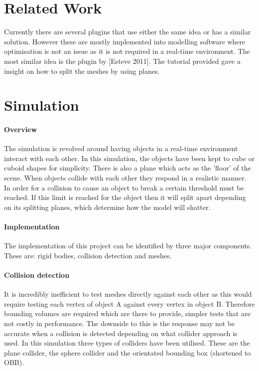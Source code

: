 \documentclass[conference,backref=page]{acmsiggraph}
\begin{document}
\section{Related Work}

Currently there are several plugins that use either the same idea or
has a similar solution. However these are mostly implemented into
modelling software where optimisation is not an issue as it is not
required in a real-time environment. The most similar idea is the
plugin by [Esteve 2011]. The tutorial provided gave a insight on how to split the meshes by using planes.

\section{Simulation}

\paragraph{Overview} \hfill

The simulation is revolved around having objects in a real-time environment interact with each other. In this simulation, the objects have been kept to cube or cuboid shapes for simplicity. There is also a plane which acts as the 'floor' of the scene. When objects collide with each other they respond in a realistic manner. In order for a collision to cause an object to break a certain threshold must be reached. If this limit is reached for the object then it will split apart depending on its splitting planes, which determine how the model will shatter.

\paragraph{Implementation}

The implementation of this project can be identified by three major components.  These are: rigid bodies, collision detection and meshes. 

\paragraph {Collision detection} \hfill

It is incredibly inefficient to test meshes directly against each other as this would require testing each vertex of object A against every vertex in object B. Therefore bounding volumes are required which are there to provide, simpler tests that are not costly in performance. The downside to this is the response may not be accurate when a collision is detected depending on what collider approach is used. In this simulation three types of colliders have been utilised. These are the plane collider, the sphere collider and the orientated bounding box (shortened to OBB). 
\end{document}
